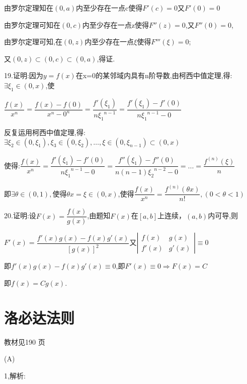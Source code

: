 由罗尔定理知在$(0,a)$内至少存在一点c使得$F'(c) = 0$又$F'(0) = 0$

由罗尔定理可知在$(0,c)$内至少存在一点z使得$F''(z) = 0$,又$F''(0) = 0$,

由罗尔定理可知,在$(0,z)$内至少存在一点$\xi $使得$F'''(\xi ) = 0$;

又$\left( {0,z} \right) \subset \left( {0,c} \right) \subset \left( {0,a} \right)$,得证.

19.证明:因为$y=f(x)$在x=0的某邻域内具有n阶导数,由柯西中值定理,得:$\exists {\xi _1} \in \left( {0,x} \right)$,使

$\dfrac{{f(x)}}{{{x^n}}} = \dfrac{{f(x) - f(0)}}{{{x^n} - {0^n}}} = \dfrac{{f'({\xi _1})}}{{n{\xi _1}^{n - 1}}} = \dfrac{{f'({\xi _1}) - f'(0)}}{{n{\xi _1}^{n - 1} - 0}}$

反复运用柯西中值定理,得:$\exists {\xi _2} \in (0,{\xi _1}),{\xi _3} \in (0,{\xi _2}), \ldots ,\xi  \in (0,{\xi _{n - 1}}) \subset (0,x)$

使得:$\dfrac{{f(x)}}{{{x^n}}} = \dfrac{{f'\left( {{\xi _1}} \right) - f'\left( 0 \right)}}{{n{\xi _1}^{n - 1} - 0}} = \dfrac{{f''\left( {{\xi _1}} \right) - f''\left( 0 \right)}}{{n\left( {n - 1} \right){\xi _2}^{n - 2} - 0}} = ... = \dfrac{{{f^{\left( n \right)}}\left( \xi  \right)}}{{n}}$

即$\exists \theta  \in (0,1),$使得$\theta x = \xi  \in (0,x)$,使得$\dfrac{{f(x)}}{{{x^n}}} = \dfrac{{{f^{(n)}}(\theta x)}}{{n!}},(0 < \theta  < 1)$

20.证明:设$F(x) = \dfrac{{f(x)}}{{g(x)}}$,由题知$F(x)$在$[a,b]$上连续，$(a,b)$内可导,则

$F'(x) = \dfrac{{f'(x)g(x) - f(x)g'(x)}}{{{{[g(x)]}^2}}}$又$\left| {\begin{array}{*{20}{c}}
{f(x)}&{g(x)}\\
{f'(x)}&{g'(x)}
\end{array}} \right| \equiv 0$

即$f'(x)g(x) - f(x)g'(x) \equiv 0$,即$F'(x) \equiv 0 \Rightarrow F(x) = C$

即$f(x) = Cg(x)$.


\section{洛必达法则}
\begin{flushright}
  \color{zhanqing!80}
   教材见190 页 %
\end{flushright}

(A)

1,解析:

